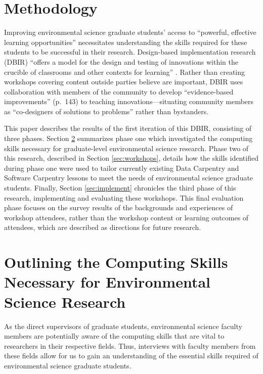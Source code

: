 \documentclass[12pt]{article}
\begin{document}
\section{Methodology}

\quad Improving environmental science graduate students' access to ``powerful,
effective learning opportunities'' \citep[p.\ 137]{penuel} necessitates
understanding the skills required for these students to be successful in their
research. Design-based implementation research (DBIR) \citep{confrey, penuel,
oneill} ``offers a model for the design and testing of innovations
within the crucible of classrooms and other contexts for learning'' 
\citep[p.\ 140]{penuel}. Rather than creating workshops covering content outside
parties believe are important, DBIR uses collaboration with members of the
community to develop ``evidence-based improvements'' (p.\ 143) to teaching 
innovations---situating community members as ``co-designers of solutions to 
problems'' \citep[p.\ 140]{penuel} rather than bystanders. 

\quad This paper describes the results of the first iteration of this DBIR, 
consisting of three phases. Section \ref{sec:faculty} summarizes phase one which 
investigated the computing skills necessary for graduate-level environmental
science research. Phase two of this research, described in Section 
\ref{sec:workshops}, details how the skills identified during phase one were
used to tailor currently existing Data Carpentry \citeyear{data-carpentry} and
Software Carpentry \citeyear{software-carpentry} lessons to meet the needs of
environmental science graduate students. Finally, Section \ref{sec:implement}
chronicles the third phase of this research, implementing and evaluating these
workshops. This final evaluation phase focuses on the survey results of the 
backgrounds and experiences of workshop attendees, rather than the workshop
content or learning outcomes of attendees, which are described as directions for
future research. 


\section{Outlining the Computing Skills Necessary for Environmental Science
Research}
\label{sec:faculty}

\quad As the direct supervisors of graduate students, environmental science
faculty members are potentially aware of the computing skills that are vital to
researchers in their respective fields. Thus, interviews with faculty members
from these fields allow for us to gain an understanding of the essential skills
required of environmental science graduate students. 
\end{document}
